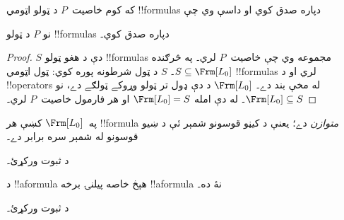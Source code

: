 \documentclass[../../../include/open-logic-section]{subfiles}
\begin{document}


\begin{thm}
  که کوم خاصيت~$P$ د ټولو اټومي !!{formula}s دپاره صدق کوي او داسې
  وي چې
  \begin{enumerate}
  \end{enumerate}
  نو $P$ د ټولو !!{formula}s دپاره صدق کوي۔
\end{thm}

\begin{proof}
  $S$ دې د هغو ټولو !!{formula}s مجموعه وي چې خاصيت~$P$ لري۔ په
  څرګنده $S \subseteq \Frm[L_0]$۔ $S$ د
   ټول شرطونه پوره کوي: ټول اټومي
  !!{formula}s لري او د !!{operator}s له مخې بند دے۔ $\Frm[L_0]$ د
  دې ډول تر ټولو وړوکے ټولګے دے، نو $\Frm[L_0] \subseteq S$۔ له دې
  امله $\Frm[L_0] = S$ او هر فارمول خاصيت~$P$ لري۔
\end{proof}

\begin{prop}
   په~$\Frm[L_0]$ کښې هر !!{formula} \emph{متوازن} دے؛ يعنې د کيڼو
   قوسونو شمېر ئې د ښيو قوسونو له شمېر سره برابر دے۔
\end{prop}

\begin{prob}
د  ثبوت ورکړئ۔
\end{prob}

\begin{prop} 
د !!a{formula} هېڅ خاصه پيلنۍ برخه !!a{formula} نۀ ده۔
\end{prop}

\begin{prob}
  د  ثبوت ورکړئ۔
\end{prob}
\end{document}
